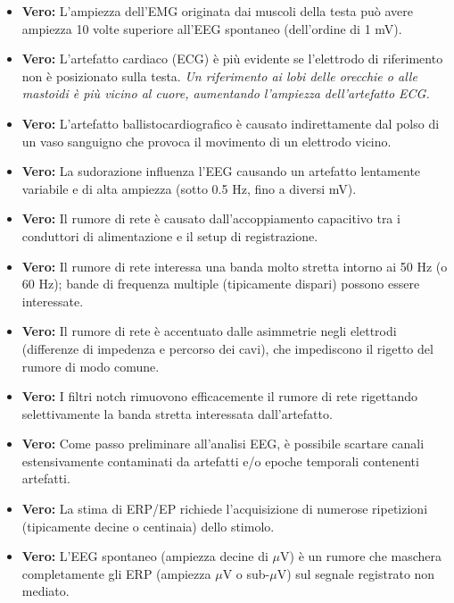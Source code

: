 \begin{itemize}
    \item \textbf{Vero:} L'ampiezza dell'EMG originata dai muscoli della testa può avere ampiezza 10 volte superiore all'EEG spontaneo (dell'ordine di 1 mV).
    
    \item \textbf{Vero:} L'artefatto cardiaco (ECG) è più evidente se l'elettrodo di riferimento non è posizionato sulla testa.
    \textit{Un riferimento ai lobi delle orecchie o alle mastoidi è più vicino al cuore, aumentando l'ampiezza dell'artefatto ECG.}
    
    \item \textbf{Vero:} L'artefatto ballistocardiografico è causato indirettamente dal polso di un vaso sanguigno che provoca il movimento di un elettrodo vicino.
    
    \item \textbf{Vero:} La sudorazione influenza l'EEG causando un artefatto lentamente variabile e di alta ampiezza (sotto 0.5 Hz, fino a diversi mV).
    
    \item \textbf{Vero:} Il rumore di rete è causato dall'accoppiamento capacitivo tra i conduttori di alimentazione e il setup di registrazione.
    
    \item \textbf{Vero:} Il rumore di rete interessa una banda molto stretta intorno ai 50 Hz (o 60 Hz); bande di frequenza multiple (tipicamente dispari) possono essere interessate.
    
    \item \textbf{Vero:} Il rumore di rete è accentuato dalle asimmetrie negli elettrodi (differenze di impedenza e percorso dei cavi), che impediscono il rigetto del rumore di modo comune.
    
    \item \textbf{Vero:} I filtri notch rimuovono efficacemente il rumore di rete rigettando selettivamente la banda stretta interessata dall'artefatto.
    
    \item \textbf{Vero:} Come passo preliminare all'analisi EEG, è possibile scartare canali estensivamente contaminati da artefatti e/o epoche temporali contenenti artefatti.
    
    \item \textbf{Vero:} La stima di ERP/EP richiede l'acquisizione di numerose ripetizioni (tipicamente decine o centinaia) dello stimolo.
    
    \item \textbf{Vero:} L'EEG spontaneo (ampiezza decine di $\mu$V) è un rumore che maschera completamente gli ERP (ampiezza $\mu$V o sub-$\mu$V) sul segnale registrato non mediato.
    

\end{itemize}
